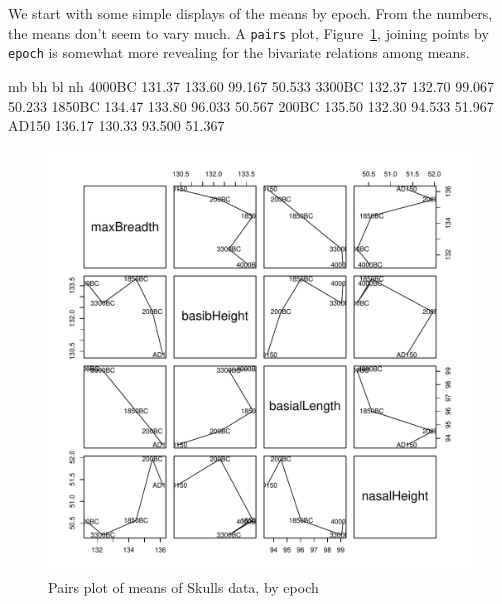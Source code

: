 \documentclass[11pt]{article}
\newcommand{\figref}[1]{Figure~\ref{#1}}
\newcommand{\code}[1]{{\texttt{#1}}}
\begin{document}
We start with some simple displays of the means by epoch.  From the numbers,
the means don't seem to vary much.  
A \code{pairs} plot, \figref{fig:skulls4}, joining points
by \code{epoch} is somewhat more revealing for the bivariate relations among means.
\begin{Schunk}
\begin{Soutput}
           mb     bh     bl     nh
4000BC 131.37 133.60 99.167 50.533
3300BC 132.37 132.70 99.067 50.233
1850BC 134.47 133.80 96.033 50.567
200BC  135.50 132.30 94.533 51.967
AD150  136.17 130.33 93.500 51.367
\end{Soutput}
\end{Schunk}
\begin{Schunk}
\end{Schunk}
\begin{figure}[htb]
\begin{center}
	\includegraphics[width=.8\textwidth]{fig/plot-skulls4}
\caption{Pairs plot of means of Skulls data, by epoch}
\label{fig:skulls4}
\end{center}
\end{figure}
\end{document}
